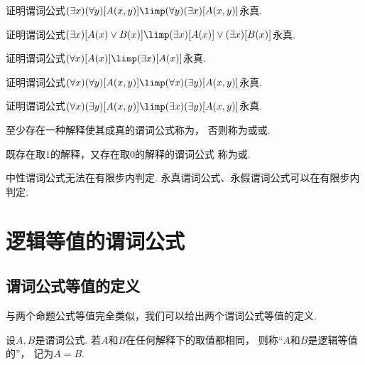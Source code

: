 \begin{example}
证明谓词公式\(
	(\exists x)
	(\forall y)
	[A(x,y)]
	\limp
	(\forall y)
	(\exists x)
	[A(x,y)]
\)永真.
\end{example}

\begin{example}
证明谓词公式\(
	(\exists x)
	[
		A(x) \lor B(x)
	]
	\limp
	(\exists x)
	[A(x)]
	\lor
	(\exists x)
	[B(x)]
\)永真.
\end{example}

\begin{example}
证明谓词公式\(
	(\forall x)
	[A(x)]
	\limp
	(\exists x)
	[A(x)]
\)永真.
\end{example}

\begin{example}
证明谓词公式\(
	(\forall x)
	(\forall y)
	[A(x,y)]
	\limp
	(\forall x)
	(\exists y)
	[A(x,y)]
\)永真.
\end{example}

\begin{example}
证明谓词公式\(
	(\forall x)
	(\exists y)
	[A(x,y)]
	\limp
	(\exists x)
	(\exists y)
	[A(x,y)]
\)永真.
\end{example}

至少存在一种解释使其成真的谓词公式称为，
否则称为或或.

既存在取\(1\)的解释，又存在取\(0\)的解释的谓词公式
称为或.

\begin{theorem}
中性谓词公式无法在有限步内判定.
永真谓词公式、永假谓词公式可以在有限步内判定.
\end{theorem}

\section{逻辑等值的谓词公式}
\subsection{谓词公式等值的定义}
与两个命题公式等值完全类似，我们可以给出两个谓词公式等值的定义.
\begin{definition}
设\(A,B\)是谓词公式.
若\(A\)和\(B\)在任何解释下的取值都相同，
则称“\(A\)和\(B\)是逻辑等值的”，
记为\(A=B\).
\end{definition}

